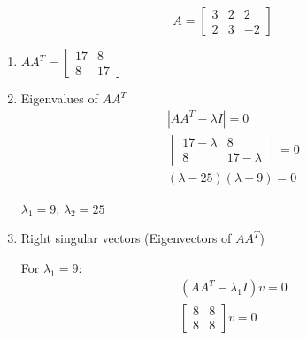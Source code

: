 \documentclass{article}
\begin{document}
\begin{example}
    \begin{equation*}
        A = \begin{bmatrix}3 & 2 & 2 \\ 2 & 3 & -2\end{bmatrix}
    \end{equation*}

    \begin{enumerate}
        \item $AA^{T} = \begin{bmatrix}17 & 8 \\ 8 & 17\end{bmatrix}$
        \item Eigenvalues of $AA^{T}$
              \begin{gather*}
                  |AA^{T} - \lambda I| = 0 \\
                  \begin{vmatrix}17-\lambda & 8 \\ 8 & 17-\lambda\end{vmatrix} = 0 \\
                  (\lambda - 25)(\lambda - 9) = 0
              \end{gather*}

              $\lambda_{1} = 9$, $\lambda_{2} = 25$
        \item Right singular vectors (Eigenvectors of $AA^{T}$)

              For $\lambda_{1} = 9$:
              \begin{gather*}
                  (AA^{T} - \lambda_{1} I)v = 0 \\
                  \begin{bmatrix}8 & 8 \\ 8 & 8\end{bmatrix} v = 0
              \end{gather*}
    \end{enumerate}
\end{example}

\printbibliography
\end{document}

